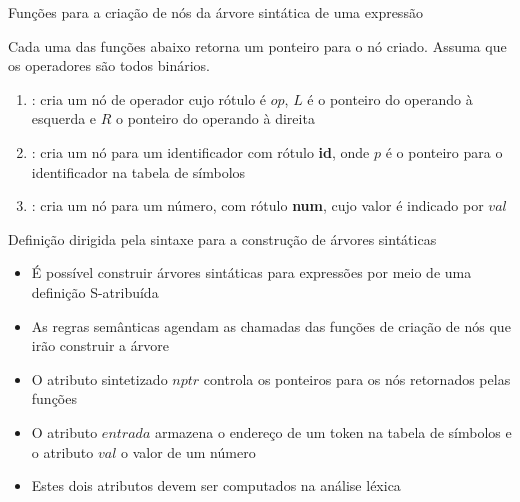 \begin{frame}[fragile]{Funções para a criação de nós da árvore sintática de uma expressão}

    Cada uma das funções abaixo retorna um ponteiro para o nó criado. Assuma que os operadores são todos binários.
    \vspace{0.2in}

    \begin{enumerate}
        \item {}: cria um nó de operador cujo rótulo é $op$, $L$ é o ponteiro do operando à esquerda e $R$ o ponteiro do operando à
            direita

        \item {}: cria um nó para um identificador com rótulo \textbf{id}, onde $p$ é o ponteiro para o identificador na tabela 
            de símbolos

        \item {}: cria um nó para um número, com rótulo \textbf{num}, cujo valor é indicado por $val$
    \end{enumerate}

\end{frame}



\begin{frame}[fragile]{Definição dirigida pela sintaxe para a construção de árvores sintáticas}

    \begin{itemize}
        \item É possível construir árvores sintáticas para expressões por meio de uma definição S-atribuída

        \item As regras semânticas agendam as chamadas das funções de criação de nós que irão construir a árvore

        \item O atributo sintetizado $nptr$ controla os ponteiros para os nós retornados pelas funções

        \item O atributo $entrada$ armazena o endereço de um token na tabela de símbolos e o atributo $val$ o valor de um número

        \item Estes dois atributos devem ser computados na análise léxica
    \end{itemize}

\end{frame}


